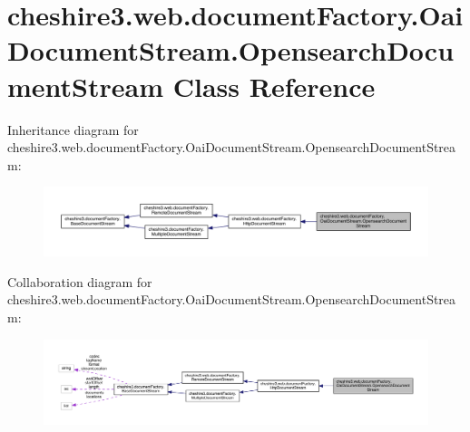 \hypertarget{classcheshire3_1_1web_1_1document_factory_1_1_oai_document_stream_1_1_opensearch_document_stream}{\section{cheshire3.\-web.\-document\-Factory.\-Oai\-Document\-Stream.\-Opensearch\-Document\-Stream Class Reference}
\label{classcheshire3_1_1web_1_1document_factory_1_1_oai_document_stream_1_1_opensearch_document_stream}
}


Inheritance diagram for cheshire3.\-web.\-document\-Factory.\-Oai\-Document\-Stream.\-Opensearch\-Document\-Stream\-:
\nopagebreak
\begin{figure}[H]
\begin{center}
\leavevmode
\includegraphics[width=350pt]{classcheshire3_1_1web_1_1document_factory_1_1_oai_document_stream_1_1_opensearch_document_stream__inherit__graph}
\end{center}
\end{figure}


Collaboration diagram for cheshire3.\-web.\-document\-Factory.\-Oai\-Document\-Stream.\-Opensearch\-Document\-Stream\-:
\nopagebreak
\begin{figure}[H]
\begin{center}
\leavevmode
\includegraphics[width=350pt]{classcheshire3_1_1web_1_1document_factory_1_1_oai_document_stream_1_1_opensearch_document_stream__coll__graph}
\end{center}
\end{figure}
